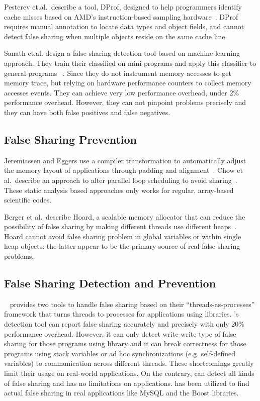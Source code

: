 Pesterev et.al.\ describe a tool, DProf, designed to help programmers identify cache misses based on
AMD's instruction-based sampling hardware~\cite{DProf}.
DProf requires manual annotation to locate data types and object fields, and cannot detect false
sharing when multiple objects reside on the same cache line.

Sanath et.al. design a false sharing detection tool based on machine learning approach. They train their classified on mini-programs and apply this classifier to general programs ~\cite{mldetect}. 
Since they do not instrument memory accesses to get memory trace, but relying on hardware performance counters to collect memory accesses events. They can achieve very low performance overhead, under 2\% performance overhead. However, they can not pinpoint problems precisely and they can have both false positives and false negatives.
 
\subsection{False Sharing Prevention}
Jeremiassen and Eggers use a compiler transformation to automatically adjust the
memory layout of applications through padding and alignment~\cite{falseshare:compile}.
Chow et al.\ describe an approach to alter parallel loop scheduling to avoid
sharing~\cite{falseshare:schedule}.
These static analysis based approaches only works for regular,
array-based scientific codes.

Berger et al.\ describe Hoard, a scalable memory allocator that can
reduce the possibility of false sharing by making different threads
use different heaps~\cite{Hoard}. Hoard 
cannot avoid false sharing problem in global variables or within
single heap objects: the latter appear to be the primary source of
real false sharing problems.

\subsection{False Sharing Detection and Prevention}
\sheriff{}~\cite{sheriff} provides two tools to handle false sharing based on 
their ``threads-as-processes'' framework that turns threads to processes for applications using 
\pthreads{} libraries.
\Sheriff{}'s detection tool 
can report false sharing accurately and precisely with only $20\%$ performance overhead.
However, it can only detect write-write type of false sharing for those programs 
using \pthreads{} library and it can break correctness for those programs using 
stack variables or ad hoc synchronizations (e.g. self-defined variables)
to communication across different threads.
These shortcomings greatly limit their usage on real-world applications.  
On the contrary, \Predator{} can detect all kinds of false sharing and has no limitations on applications.
\Predator{} has been utilized to find actual false sharing in real applications like MySQL and the Boost libraries.

